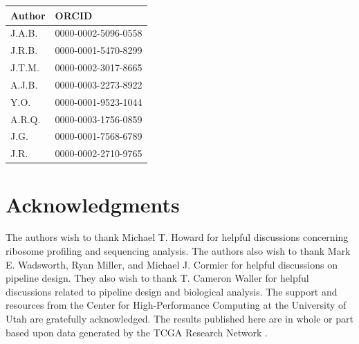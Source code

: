 \documentclass[10pt, oneside]{article}
\newcommand{\beginsupplement}{%
  \setcounter{table}{0}
  \renewcommand{\thetable}{S\arabic{table}}%
  \setcounter{figure}{0}
  \renewcommand{\thefigure}{S\arabic{figure}}%
}
\begin{document}
\begin{table}[!]
    \centering
{}
\begin{tabular}{p{1.5cm}p{4cm}}
 \textbf{Author} & \textbf{ORCID}\\
 \hline
 J.A.B. & 0000-0002-5096-0558 \\
 \hline
 J.R.B. & 0000-0001-5470-8299 \\
 \hline
 J.T.M. & 0000-0002-3017-8665 \\
 \hline
 A.J.B. & 0000-0003-2273-8922 \\
 \hline
 Y.O. & 0000-0001-9523-1044 \\
 \hline
 A.R.Q. & 0000-0003-1756-0859 \\
 \hline
 J.G. & 0000-0001-7568-6789 \\
 \hline
 J.R. & 0000-0002-2710-9765 \\
\end{tabular}
\end{table}

\section*{Acknowledgments}
The authors wish to thank Michael T. Howard for helpful discussions concerning ribosome profiling and sequencing analysis. The authors also wish to thank Mark E. Wadsworth, Ryan Miller, and Michael J. Cormier for helpful discussions on pipeline design. They also wish to thank T. Cameron Waller for helpful discussions related to pipeline design and biological analysis. The support and resources from the Center for High-Performance Computing at the University of Utah are gratefully acknowledged. The results published here are in whole or part based upon data generated by the TCGA Research Network \cite{tcga}.\\




\newpage
\beginsupplement
\end{document}
